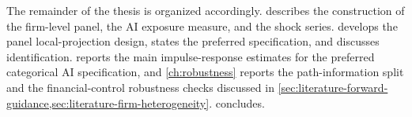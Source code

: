 The remainder of the thesis is organized accordingly.
 describes the construction of the firm-level panel,
the AI exposure measure, and the shock series.
 develops the panel local-projection design,
states the preferred specification, and discusses identification.
 reports the main impulse-response estimates for the
preferred categorical AI specification, and \cref{ch:robustness}
reports the path-information split and the financial-control
robustness checks discussed in
\cref{sec:literature-forward-guidance,sec:literature-firm-heterogeneity}.
 concludes.